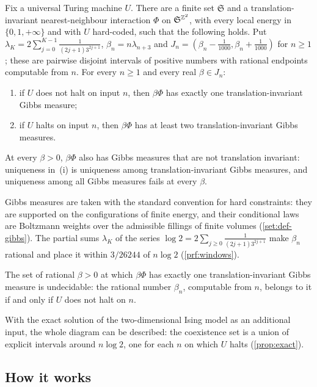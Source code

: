 \begin{mainA}
Fix a universal Turing machine $U$. There are a finite set $\mathfrak S$ and a translation-invariant nearest-neighbour interaction $\Phi$ on $\mathfrak S^{\mathbb{Z}^2}$, with every local energy in $\{0,1,+\infty\}$ and with $U$ hard-coded, such that the following holds. Put $\lambda_K=2\sum_{j=0}^{K-1}\frac{1}{(2j+1)3^{2j+1}}$, $\beta_n=n\lambda_{n+3}$ and $J_n=(\beta_n-\frac1{1000},\beta_n+\frac1{1000})$ for $n\ge1$; these are pairwise disjoint intervals of positive numbers with rational endpoints computable from $n$. For every $n\ge1$ and every real $\beta\in J_n$:
\begin{enumerate}[label=\textup{(\roman*)}]
\item if $U$ does not halt on input $n$, then $\beta\Phi$ has exactly one translation-invariant Gibbs measure;
\item if $U$ halts on input $n$, then $\beta\Phi$ has at least two translation-invariant Gibbs measures.
\end{enumerate}
At every $\beta>0$, $\beta\Phi$ also has Gibbs measures that are not translation invariant: uniqueness in~(i) is uniqueness among translation-invariant Gibbs measures, and uniqueness among all Gibbs measures fails at every $\beta$.
\end{mainA}

Gibbs measures are taken with the standard convention for hard constraints: they are supported on the configurations of finite energy, and their conditional laws are Boltzmann weights over the admissible fillings of finite volumes (\cref{set:def-gibbs}). The partial sums $\lambda_K$ of the series $\log2=2\sum_{j\ge0}\frac{1}{(2j+1)3^{2j+1}}$ make $\beta_n$ rational and place it within $3/26244$ of $n\log 2$ (\cref{prf:windows}).

\begin{mainB}
The set of rational $\beta>0$ at which $\beta\Phi$ has exactly one translation-invariant Gibbs measure is undecidable: the rational number $\beta_n$, computable from $n$, belongs to it if and only if $U$ does not halt on $n$.
\end{mainB}

With the exact solution of the two-dimensional Ising model as an additional input, the whole diagram can be described: the coexistence set is a union of explicit intervals around $n\log2$, one for each $n$ on which $U$ halts (\cref{prop:exact}).

\subsection{How it works}

